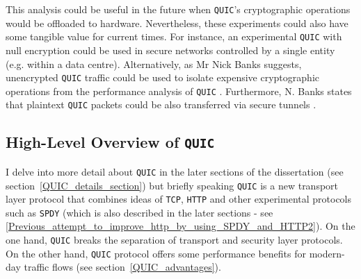 \documentclass[12pt,a4paper,twoside,openright]{report}
\begin{document}
This analysis could be useful in the future when \texttt{QUIC}’s cryptographic operations would be offloaded to hardware. Nevertheless, these experiments could also have some tangible value for current times. 
For instance, an experimental \texttt{QUIC} with null encryption could be used in secure networks controlled by a single entity (e.g. within a data centre).
Alternatively, as Mr Nick Banks suggests, unencrypted \texttt{QUIC} traffic could be used to isolate expensive cryptographic operations from the performance analysis of \texttt{QUIC} \cite{banks-quic-disable-encryption-00}.
Furthermore, N. Banks states that plaintext \texttt{QUIC} packets could be also transferred via secure tunnels \cite{banks-quic-disable-encryption-00}.



 
 
 
 

\subsection{High-Level Overview of \texttt{QUIC}}
I delve into more detail about \texttt{QUIC} in the later sections of the dissertation (see section~\ref{QUIC_details_section}) but briefly speaking \texttt{QUIC} is a new transport layer protocol that combines ideas of \texttt{TCP}, \texttt{HTTP} and other experimental protocols such as \texttt{SPDY} (which is also described in the later sections - see \ref{Previous_attempt_to_improve_http_by_using_SPDY_and_HTTP2}).
On the one hand, \texttt{QUIC} breaks the separation of transport and security layer protocols. 
On the other hand, \texttt{QUIC} protocol offers some performance benefits for modern-day traffic flows (see section~\ref{QUIC_advantages}).
\end{document}
